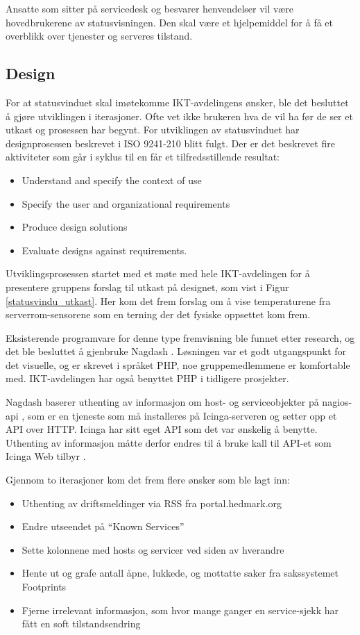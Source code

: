 Ansatte som sitter på servicedesk og besvarer henvendelser vil være hovedbrukerene av statusvisningen. Den skal være et hjelpemiddel for å få et overblikk over tjenester og serveres tilstand.

\subsection{Design}
For at statusvinduet skal imøtekomme IKT-avdelingens ønsker, ble det besluttet å gjøre utviklingen i iterasjoner. Ofte vet ikke brukeren hva de vil ha før de ser et utkast og prosessen har begynt. For utviklingen av statusvinduet har designprosessen beskrevet i ISO 9241-210 blitt fulgt. Der er det beskrevet fire aktiviteter som går i syklus til en får et tilfredsstillende resultat:
\begin{itemize}
	\item Understand and specify the context of use
	\item Specify the user and organizational requirements
	\item Produce design solutions
	\item Evaluate designs against requirements.
\end{itemize}

Utviklingsprosessen startet med et møte med hele IKT-avdelingen for å presentere gruppens forslag til utkast på designet, som vist i Figur \ref{statusvindu_utkast}. Her kom det frem forslag om å vise temperaturene fra serverrom-sensorene som en terning der det fysiske oppsettet kom frem.

Eksisterende programvare for denne type fremvisning ble funnet etter research, og det ble besluttet å gjenbruke Nagdash \cite{nagdash}. Løsningen var et godt utgangspunkt for det visuelle, og er skrevet i språket PHP, noe gruppemedlemmene er komfortable med. IKT-avdelingen har også benyttet PHP i tidligere prosjekter. 

Nagdash baserer uthenting av informasjon om host- og serviceobjekter på nagios-api \cite{nagiosapi}, som er en tjeneste som må installeres på Icinga-serveren og setter opp et API over HTTP. Icinga har sitt eget API som det var ønskelig å benytte. Uthenting av informasjon måtte derfor endres til å bruke kall til API-et som Icinga Web tilbyr \cite{icingarestapi}.

Gjennom to iterasjoner kom det frem flere ønsker som ble lagt inn:
\begin{itemize}
	 \item Uthenting av driftsmeldinger via RSS fra portal.hedmark.org
	 \item Endre utseendet på ``Known Services''
	 \item Sette kolonnene med hosts og servicer ved siden av hverandre 
	 \item Hente ut og grafe antall åpne, lukkede, og mottatte saker fra sakssystemet Footprints
	 \item Fjerne irrelevant informasjon, som hvor mange ganger en service-sjekk har fått en soft tilstandsendring
\end{itemize}

